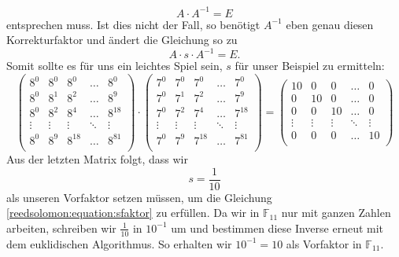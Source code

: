 \[
A \cdot A^{-1} = E
\]
entsprechen muss.
Ist dies nicht der Fall, so benötigt $A^{-1}$ eben genau diesen Korrekturfaktor und ändert die Gleichung so zu
\begin{equation}
	A \cdot s \cdot A^{-1} = E.
	\label{reedsolomon:equation:sfaktor}
\end{equation}
Somit sollte es für uns ein leichtes Spiel sein, $s$ für unser Beispiel zu ermitteln:
\[
\begin{pmatrix}
	8^0 & 8^0 & 8^0 & \dots & 8^0 \\
	8^0 & 8^1 & 8^2 & \dots & 8^9 \\
	8^0 & 8^2 & 8^4 & \dots & 8^{18} \\
	\vdots & \vdots & \vdots & \ddots & \vdots \\
	8^0 & 8^9 & 8^{18} & \dots & 8^{81} \\
\end{pmatrix}
\cdot
\begin{pmatrix}
	7^0 & 7^0 & 7^0 & \dots & 7^0 \\
	7^0 & 7^{1} & 7^{2} & \dots & 7^{9} \\
	7^0 & 7^{2} & 7^{4} & \dots & 7^{18} \\
	\vdots & \vdots & \vdots & \ddots & \vdots \\
	7^0 & 7^{9} & 7^{18} & \dots & 7^{81} \\
\end{pmatrix}
=
\begin{pmatrix}
	10 & 0 & 0 & \dots & 0 \\
	0 & 10 & 0 & \dots & 0 \\
	0 & 0 & 10 & \dots & 0 \\
	\vdots & \vdots & \vdots  & \ddots & \vdots \\
	0 & 0 & 0 & \dots & 10 \\
\end{pmatrix}
\]
Aus der letzten Matrix folgt, dass wir
\[
s = \dfrac{1}{10}
\]
als unseren Vorfaktor setzen müssen, um die Gleichung \ref{reedsolomon:equation:sfaktor} zu erfüllen. Da wir in $\mathbb{F}_{11}$ nur mit ganzen Zahlen arbeiten, schreiben wir $\frac{1}{10}$ in $10^{-1}$ um und bestimmen diese Inverse erneut mit dem euklidischen Algorithmus. So erhalten wir $10^{-1} = 10$ als Vorfaktor in $\mathbb{F}_{11}$.
%
%
